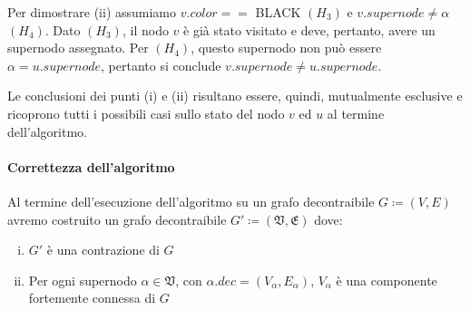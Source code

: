     Per dimostrare (ii) assumiamo $v.color ==$ BLACK $(H_3)$ e $v.supernode \ne \alpha$ $(H_4)$.
    Dato $(H_3)$, il nodo $v$ \`e gi\`a stato visitato e deve, pertanto, avere un supernodo assegnato.
    Per $(H_4)$, questo supernodo non pu\`o essere $\alpha = u.supernode$, pertanto si conclude
    $v.supernode \neq u.supernode$. \newline

    Le conclusioni dei punti (i) e (ii) risultano essere, quindi, mutualmente esclusive e ricoprono tutti i possibili
    casi sullo stato del nodo $v$ ed $u$ al termine dell'algoritmo.

    \paragraph{Correttezza dell'algoritmo}
    Al termine dell'esecuzione dell'algoritmo su un grafo decontraibile $G\coloneqq(V, E)$ avremo costruito un grafo
    decontraibile $G\mathcal{'} \coloneqq (\mathfrak{V}, \mathfrak{E})$ dove:
    \begin{enumerate}[(i)]
        \item $G\mathcal{'}$ \`e una contrazione di $G$
        \item Per ogni supernodo $\alpha \in \mathfrak{V}$, con $\alpha.dec = (V_{\alpha}, E_{\alpha})$, $V_{\alpha}$ \`e una componente fortemente
        connessa di $G$
    \end{enumerate}

